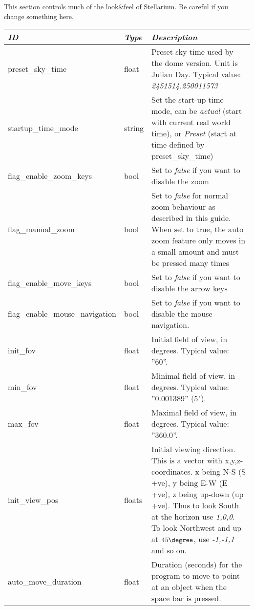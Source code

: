 This section controls much of the look\&feel of Stellarium. Be careful if you change something here.


\begin{longtable}{l|l|p{77mm}}\toprule
\emph{ID}              & \emph{Type} & \emph{Description}\\\midrule
preset\_sky\_time               & float  & Preset sky time used by the dome version. Unit is Julian Day. Typical value: \emph{2451514.250011573}\\%
startup\_time\_mode             & string & Set the start-up time mode, can be \emph{actual} (start with current real world time), 
                                           or \emph{Preset} (start at time defined by preset\_sky\_time)\\%
flag\_enable\_zoom\_keys        & bool   & Set to \emph{false} if you want to disable the zoom\\%
flag\_manual\_zoom              & bool   & Set to \emph{false} for normal zoom behaviour as described in this guide. 
                                           When set to true, the auto zoom feature only moves in a small amount and must be pressed many times\\%
flag\_enable\_move\_keys        & bool   & Set to \emph{false} if you want to disable the arrow keys\\%
flag\_enable\_mouse\_navigation & bool   & Set to \emph{false} if you want to disable the mouse navigation.\\%
init\_fov                       & float  & Initial field of view, in degrees. Typical value: ''60''.\\%
min\_fov                        & float  & Minimal field of view, in degrees. Typical value: ''0.001389'' (5").\\%
max\_fov                        & float  & Maximal field of view, in degrees. Typical value: ''360.0''.\\%
init\_view\_pos                 & floats & Initial viewing direction. This is a vector with x,y,z-coordinates. x being N-S (S +ve), 
                                           y being E-W (E +ve), z being up-down (up +ve). Thus to look South at the horizon use \emph{1,0,0}. 
                                           To look Northwest and up at $45\degree$, use \emph{-1,-1,1} and so on.\\%
auto\_move\_duration            & float  & Duration (seconds) for the program to move to point at an object when the space bar is pressed. 

\end{longtable}
